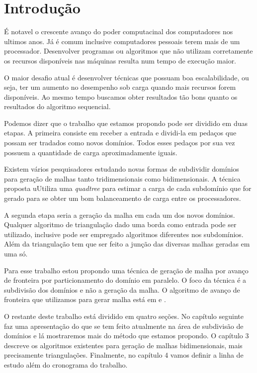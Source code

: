 \cleardoublepage
\pagestyle{fancy}

\chapter{Introdução}\label{intro}
É notavel o crescente avanço do poder computacinal dos computadores nos ultimos anos. Já é comum inclusive computadores pessoais terem mais de um processador. Desenvolver programas ou algoritmos que não utilizam corretamente os recursos disponíveis nas máquinas resulta num tempo de execução maior.

O maior desafio atual é desenvolver técnicas que possuam boa escalabilidade, ou seja, ter um aumento no desempenho sob carga quando mais recursos forem disponíveis. Ao mesmo tempo buscamos obter resultados tão bons quanto os resultados do algoritmo sequencial.

Podemos dizer que o trabalho que estamos propondo pode ser dividido em duas etapas. A primeira consiste em receber a entrada e dividi-la em pedaços que possam ser tradados como novos domínios. Todos esses pedaços por sua vez possuem a quantidade de carga aproximadamente iguais.

Existem vários pesquisadores estudando novas formas de subdividir domínios para geração de malhas tanto tridimensionais como bidimensionais. A técnica proposta uUtiliza uma \textit{quadtree} para estimar a carga de cada subdomínio que for gerado para se obter um bom balanceamento de carga entre os processadores.

A segunda etapa seria a geração da malha em cada um dos novos domínios. Qualquer algoritmo de triangulação dado uma borda como entrada pode ser utilizado, inclusive pode ser empregado algoritmos diferentes nos subdomínios. Além da triangulação tem que ser feito a junção das diversas malhas geradas em uma só.

Para esse trabalho estou propondo uma técnica de geração de malha por avanço de fronteira por particionamento do domínio em paralelo. O foco da técnica é a subdivisão dos domínios e não a geração da malha. O algoritmo de avanço de fronteira que utilizamos para gerar malha está em \cite{bib:Miranda99} e \cite{bib:Cavalcante-Neto01}.

O restante deste trabalho está dividido em quatro seções. No capítulo seguinte faz uma apresentação do que se tem feito atualmente na área de subdivisão de domínios e lá mostraremos mais do método que estamos propondo. O capítulo 3 descreve os algoritmos existentes para geração de malhas bidimensionais, mais precisamente triangulações. Finalmente, no capítulo 4 vamos definir a linha de estudo além do cronograma do trabalho.

